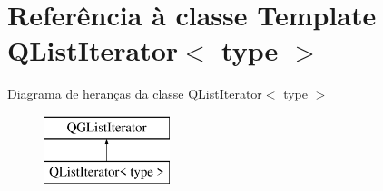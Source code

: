\hypertarget{class_q_list_iterator}{\section{Referência à classe Template Q\-List\-Iterator$<$ type $>$}
\label{class_q_list_iterator}
}
Diagrama de heranças da classe Q\-List\-Iterator$<$ type $>$\begin{figure}[H]
\begin{center}
\leavevmode
\includegraphics[height=2.000000cm]{class_q_list_iterator}
\end{center}
\end{figure}
